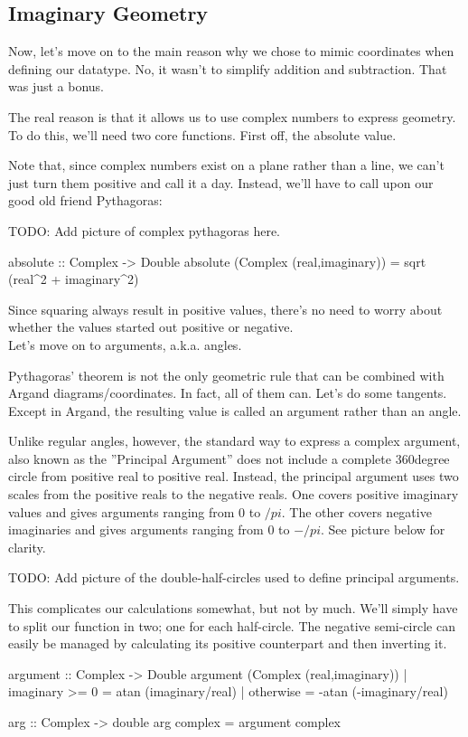 \subsection{Imaginary Geometry}

Now, let's move on to the main reason why we chose to mimic coordinates when defining our datatype. No, it wasn't to simplify addition and subtraction. That was just a bonus.

The real reason is that it allows us to use complex numbers to express geometry. To do this, we'll need two core functions. First off, the absolute value.

Note that, since complex numbers exist on a plane rather than a line, we can't just turn them positive and call it a day. Instead, we'll have to call upon our good old friend Pythagoras:

TODO: Add picture of complex pythagoras here.

\begin{code}
absolute :: Complex -> Double
absolute (Complex (real,imaginary)) = sqrt (real^2 + imaginary^2)
\end{code}
Since squaring always result in positive values, there's no need to worry about whether the values started out positive or negative.\\
Let's move on to arguments, a.k.a. angles.

Pythagoras' theorem is not the only geometric rule that can be combined with Argand diagrams/coordinates. In fact, all of them can. Let's do some tangents. Except in Argand, the resulting value is called an argument rather than an angle.

Unlike regular angles, however, the standard way to express a complex argument, also known as the ''Principal Argument'' does not include a complete 360degree circle from positive real to positive real. Instead, the principal argument uses two scales from the positive reals to the negative reals. One covers positive imaginary values and gives arguments ranging from 0 to $/pi$. The other covers negative imaginaries and gives arguments ranging from 0 to $-/pi$. See picture below for clarity.

TODO: Add picture of the double-half-circles used to define principal arguments.

This complicates our calculations somewhat, but not by much. We'll simply have to split our function in two; one for each half-circle. The negative semi-circle can easily be managed by calculating its positive counterpart and then inverting it.
\begin{code} %
argument :: Complex -> Double
argument (Complex (real,imaginary))
  | imaginary >= 0  = atan (imaginary/real)
  | otherwise       = -atan (-imaginary/real)
    
arg :: Complex -> double
arg complex = argument complex
\end{code} %

